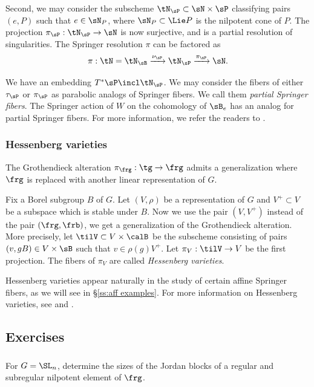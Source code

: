 Second, we may consider the subscheme $\tN_{\sP}\subset\sN\times \sP$ classifying pairs $(e,P)$ such that $e\in\sN_{P}$, where $\sN_{P}\subset\Lie P$ is the nilpotent cone of $P$.  The projection $\pi_{\sP}: \tN_{\sP}\to \sN$ is now surjective, and is a partial resolution of singularities. The Springer resolution $\pi$ can be factored as
\begin{equation*}
\pi: \tN=\tN_{\sB}\xrightarrow{\nu_{\sP}}\tN_{\sP}\xrightarrow{\pi_{\sP}} \sN. 
\end{equation*}

We have an embedding $T^{*}\sP\incl \tN_{\sP}$.  We may consider the fibers of either $\tau_{\sP}$ or $\pi_{\sP}$ as parabolic analogs of Springer fibers.  We call them {\em partial Springer fibers}. The Springer action of $W$ on the cohomology of $\sB_{e}$ has an analog for partial Springer fibers. For more information, we refer the readers to \cite{BM}.

\subsubsection{Hessenberg varieties} The Grothendieck alteration $\pi_{\frg}:\tg\to \frg$ admits a generalization where $\frg$ is replaced with another linear representation of $G$.

Fix a Borel subgroup $B$ of $G$. Let $(V,\rho)$ be a representation of $G$ and $V^{+}\subset V$ be a subspace which is stable under $B$. Now we use the pair $(V,V^{+})$ instead of the pair $(\frg,\frb)$, we get a generalization of the Grothendieck alteration. More precisely, let $\tilV\subset V\times \calB$ be the subscheme consisting of pairs $(v, gB)\in V\times\sB$ such that $v\in \rho(g)V^{+}$. Let $\pi_{V}:\tilV\to V$ be the first projection. The fibers of $\pi_{V}$ are called {\em Hessenberg varieties}.

Hessenberg varieties appear naturally in the study of certain affine Springer fibers, as we will see in \S\ref{ss:aff examples}. For more information on Hessenberg varieties, see \cite{GKM} and \cite{OY}.


\subsection{Exercises}

\subsubsection{} For $G=\SL_{n}$, determine the sizes of the Jordan blocks of a regular and subregular nilpotent element of $\frg$.
 
